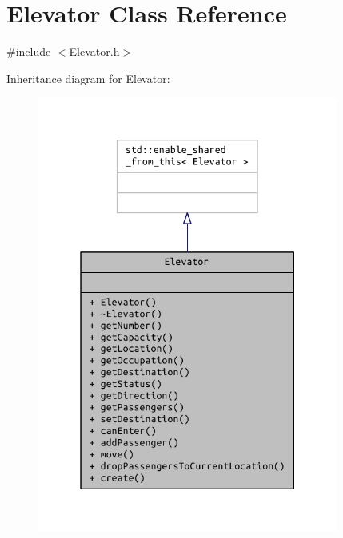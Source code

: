 \hypertarget{class_elevator}{}\section{Elevator Class Reference}
\label{class_elevator}


{\ttfamily \#include $<$Elevator.\+h$>$}



Inheritance diagram for Elevator\+:
\nopagebreak
\begin{figure}[H]
\begin{center}
\leavevmode
\includegraphics[width=280pt]{class_elevator__inherit__graph}
\end{center}
\end{figure}


